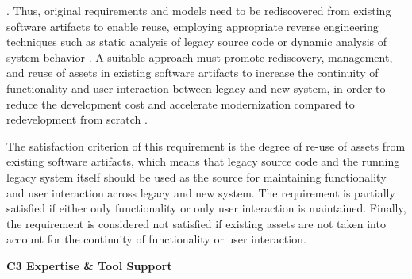 \autocite{Wagner2014,Bisbal1999LegacyInformationSystems,Sneed2010SoftwareMigration,warren2012renaissance,Batlajery2014IndustrialSurveyModernization,Lucia2008}.
Thus, original requirements and models need to be rediscovered from existing software artifacts to enable reuse, employing appropriate reverse engineering techniques such as static analysis of legacy source code or dynamic analysis of system behavior \autocite{Lucia2008}.
A suitable approach must promote rediscovery, management, and reuse of assets in existing software artifacts to increase the continuity of functionality \autocite{Almonaies2010SOAStrategies} and user interaction between legacy and new system, in order to reduce the development cost \autocite{Khadka2016PHD} and accelerate modernization compared to redevelopment from scratch \autocite{Sneed2010SoftwareMigration}.

The satisfaction criterion of this requirement is the degree of re-use of assets from existing software artifacts, which means that legacy source code and the running legacy system itself should be used as the source for maintaining functionality and user interaction across legacy and new system.
The requirement is partially satisfied if either only functionality or only user interaction is maintained.
Finally, the requirement is considered not satisfied if existing assets are not taken into account for the continuity of functionality or user interaction.

\textbf{C3 Expertise \& Tool Support}

